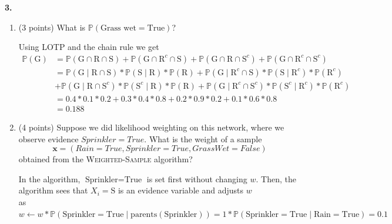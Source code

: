 \documentclass[12pt]{amsart}
\newenvironment{statement}[1]{\smallskip\noindent\color[rgb]{0.0,0.0,0.0} {\bf #1.}}{}
\newcommand{\Grass}{\text{G}}
\newcommand{\Rain}{\text{R}}
\newcommand{\Sprinkler}{\text{S}}
\newcommand{\True}{\text{True}}
\newcommand{\bP}{\mathbb{P}}
\newcommand{\1}{\mathds{1}}
\begin{document}
\begin{statement}{3}
\begin{enumerate}
        \item (3 points) What is $\mathbb{P}(\text{Grass wet}=\text{True})$?
        \begin{tcolorbox}
            Using LOTP and the chain rule we get 
            \begin{align*}
                \bP(\Grass) &= \bP(\Grass\cap\Rain\cap\Sprinkler) + \bP(\Grass\cap\Rain^c\cap\Sprinkler) + \bP(\Grass\cap\Rain\cap\Sprinkler^c) + \bP(\Grass\cap\Rain^c\cap\Sprinkler^c)\\ 
                &= \bP(\Grass\mid\Rain\cap\Sprinkler)*\bP(\Sprinkler\mid\Rain)*\bP(\Rain) + \bP(\Grass\mid\Rain^c\cap\Sprinkler)*\bP(\Sprinkler\mid\Rain^c)*\bP(\Rain^c) \\ 
                &+ \bP(\Grass\mid\Rain\cap\Sprinkler^c)*\bP(\Sprinkler^c\mid\Rain)*\bP(\Rain) + \bP(\Grass\mid\Rain^c\cap\Sprinkler^c)*\bP(\Sprinkler^c\mid\Rain^c)*\bP(\Rain^c)\\ 
                &= 0.4*0.1*0.2 + 0.3*0.4*0.8 + 0.2*0.9*0.2 + 0.1*0.6*0.8\\
                &= 0.188
            \end{align*}
        \end{tcolorbox}
        \item (4 points) Suppose we did likelihood weighting on this network, where we observe evidence $Sprinkler=True$.
        What is the weight of a sample \[\bm x = (Rain=True, Sprinkler=True, GrassWet=False)\] obtained from the \textsc{Weighted-Sample} algorithm?\\ 
        \begin{tcolorbox}
            In the algorithm, $\text{Sprinkler} = \True$ is set first without changing $w$. Then, the algorithm sees that $X_i = \Sprinkler$ is an evidence 
            variable and adjusts $w$ \\as $w \gets w*\bP(\text{Sprinkler}=\True\mid \text{parents}(\text{Sprinkler})) = 1 * \bP(\text{Sprinkler} = \True \mid 
            \text{Rain} = \True) = 0.1$
        \end{tcolorbox}
    \end{enumerate}

\end{statement}

\newpage
\end{document}
